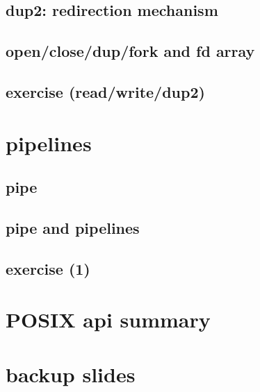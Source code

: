 

\subsection{dup2: redirection mechanism}



\subsection{open/close/dup/fork and fd array}



\subsection{exercise (read/write/dup2)}



\section{pipelines}

\subsection{pipe}



\subsection{pipe and pipelines}




\subsection{exercise (1)}


\section{POSIX api summary}


\section{backup slides}
\begin{frame}{}
\end{frame}

